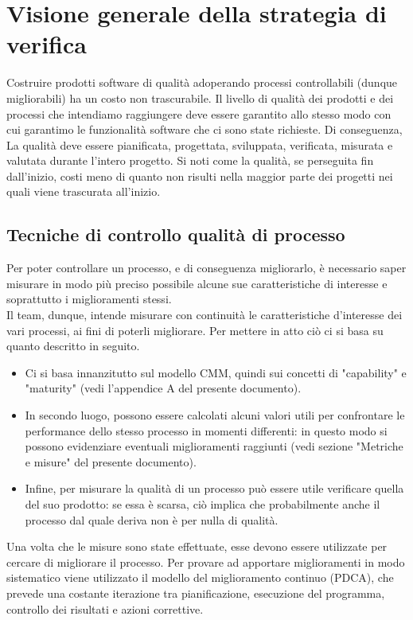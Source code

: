 
\section{Visione generale della strategia di verifica}
	Costruire prodotti software di qualità adoperando processi controllabili (dunque migliorabili) ha un costo non trascurabile. Il livello di qualità 
	dei prodotti e dei processi che intendiamo raggiungere deve essere garantito allo stesso modo con cui garantimo le funzionalità software che ci 
	sono state richieste. Di conseguenza, La qualità deve essere pianificata, progettata, sviluppata, verificata, misurata e valutata durante l'intero 
	progetto. Si noti come la qualità, se perseguita fin dall'inizio, costi meno di quanto non risulti nella maggior parte dei progetti nei quali viene 
	trascurata all'inizio.
	\subsection{Tecniche di controllo qualità di processo}
		Per poter controllare un processo, e di conseguenza migliorarlo, è necessario saper misurare in modo più preciso possibile alcune sue 
		caratteristiche di interesse e soprattutto i miglioramenti stessi.\\
		Il team, dunque, intende misurare con continuità le caratteristiche d'interesse dei vari processi, ai fini di poterli migliorare. Per mettere in 
		atto ciò ci si basa su quanto descritto in seguito.
		\begin{itemize}
			\item Ci si basa innanzitutto sul modello CMM, quindi sui concetti di "capability" e "maturity" (vedi l'appendice A del presente documento).
			\item In secondo luogo, possono essere calcolati alcuni valori utili per confrontare le performance dello stesso processo in momenti 
			differenti: in questo modo si possono evidenziare eventuali miglioramenti raggiunti (vedi sezione "Metriche e misure" del presente documento).
			\item Infine, per misurare la qualità di un processo può essere utile verificare quella del suo prodotto: se essa è scarsa, ciò implica che 
			probabilmente anche il processo dal quale deriva non è per nulla di qualità.
		\end{itemize}
		Una volta che le misure sono state effettuate, esse devono essere utilizzate per cercare di migliorare il processo. Per provare ad apportare 
		miglioramenti in modo sistematico viene utilizzato il modello del miglioramento continuo (PDCA), che prevede una costante iterazione tra 
		pianificazione, esecuzione del programma, controllo dei risultati e azioni correttive.\\
